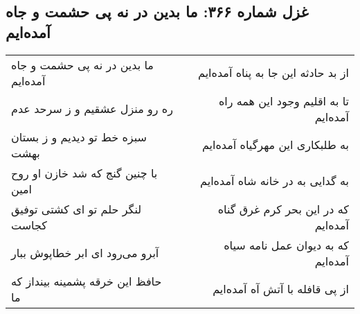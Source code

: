 \begin{center}
\section*{غزل شماره ۳۶۶: ما بدین در نه پی حشمت و جاه آمده‌ایم}
\label{sec:sh366}
\begin{longtable}{l p{0.5cm} r}
ما بدین در نه پی حشمت و جاه آمده‌ایم
&&
از بد حادثه این جا به پناه آمده‌ایم
\\
ره رو منزل عشقیم و ز سرحد عدم
&&
تا به اقلیم وجود این همه راه آمده‌ایم
\\
سبزه خط تو دیدیم و ز بستان بهشت
&&
به طلبکاری این مهرگیاه آمده‌ایم
\\
با چنین گنج که شد خازن او روح امین
&&
به گدایی به در خانه شاه آمده‌ایم
\\
لنگر حلم تو ای کشتی توفیق کجاست
&&
که در این بحر کرم غرق گناه آمده‌ایم
\\
آبرو می‌رود ای ابر خطاپوش ببار
&&
که به دیوان عمل نامه سیاه آمده‌ایم
\\
حافظ این خرقه پشمینه بینداز که ما
&&
از پی قافله با آتش آه آمده‌ایم
\\
\end{longtable}
\end{center}
